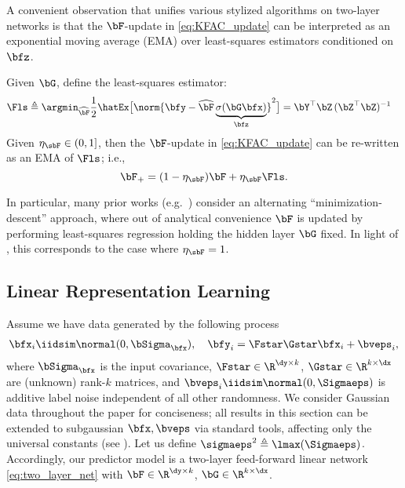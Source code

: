 A convenient observation that unifies various stylized algorithms on two-layer networks is that the $\bF$-update in \eqref{eq:KFAC_update} can be interpreted as an exponential moving average (EMA) over least-squares estimators conditioned on $\bfz$.
\begin{lemma}\label{lem:KFAC_is_EMA}
    Given $\bG$, define the least-squares estimator:
    \begin{align*}
        \Fls &\triangleq \argmin_{\widehat{\bF}} \frac{1}{2}\hatEx\big[\norm{\bfy - \widehat{\bF} \underbrace{\sigma(\bG \bfx)}_{\bfz}}^2\big]= \bY^\top \bZ \, (\bZ^\top \bZ)^{-1}
    \end{align*}
    Given $\eta_\sbF \in (0, 1]$, then the $\bF$-update in \eqref{eq:KFAC_update} can be re-written as an EMA of $\Fls$; i.e., $$\bF_+ = (1 - \eta_\sbF) \bF + \eta_\sbF \Fls.$$
\end{lemma}
In particular, many prior works (e.g.\ \citet{collins2021exploiting, nayer2022fast, thekumparampil2021sample, zhang2023meta}) consider an alternating ``minimization-descent'' approach, where out of analytical convenience $\bF$ is updated by performing least-squares regression holding the hidden layer $\bG$ fixed. In light of , this corresponds to the case where $\eta_\sbF = 1$.

\subsection{Linear Representation Learning}\label{sec:lin_rep}

Assume we have data generated by the following process
\begin{align}\label{eq:linrep_datagen}
    \bfx_i \iidsim \normal(0, \bSigma_\bfx), \quad \bfy_i = \Fstar \Gstar \bfx_i + \bveps_i,
\end{align}
where $\bSigma_\bfx$ is the input covariance, $\Fstar \in \R^{\dy \times k}$, $\Gstar \in \R^{k \times \dx}$ are (unknown) rank-$k$ matrices, and $\bveps_i \iidsim \normal(0, \Sigmaeps)$ is additive label noise independent of all other randomness. We consider Gaussian data throughout the paper for conciseness; all results in this section can be extended to subgaussian $\bfx, \bveps$ via standard tools, affecting only the universal constants (see ). Let us define $\sigmaeps^2 \triangleq \lmax(\Sigmaeps)$. Accordingly, our predictor model is a two-layer feed-forward linear network \eqref{eq:two_layer_net} with $\bF \in \R^{\dy \times k}$, $\bG \in \R^{k \times \dx}$.

